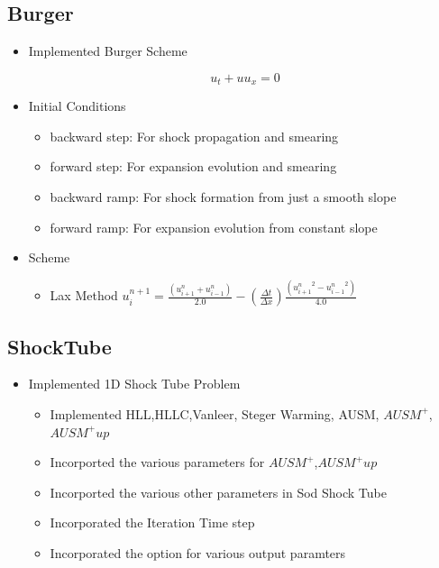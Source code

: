 \documentclass{beamer}
\begin{document}
\subsection{Burger}
\begin{frame}
\begin{itemize}
 \item Implemented Burger Scheme

\begin{equation}
            u_t + u u_x = 0
\end{equation}
\item Initial Conditions
\begin{itemize}	  
\item backward step: For shock propagation and smearing
\item forward step: For expansion evolution and smearing
\item backward ramp: For shock formation from just a smooth slope
\item forward ramp: For expansion evolution from constant slope
\end{itemize}  
\item Scheme
\begin{itemize}	  
\item Lax Method
$u^{n+1}_i = \frac{(u^n_{i+1}+u^n_{i-1})}{2.0} - (\frac{\Delta t}{ \Delta x})\frac{( {u^n_{i+1}}^2- {u^n_{i-1}}^2) }{4.0} $
	    \end{itemize}
\end{itemize}  
\end{frame}
\subsection{ShockTube}
\begin{frame}
\begin{itemize}
 \item Implemented 1D Shock Tube Problem
\begin{itemize}	  
\item Implemented HLL,HLLC,Vanleer, Steger Warming, AUSM, $AUSM^+$,$AUSM^+up$
\item Incorported the various parameters for  $AUSM^+$,$AUSM^+up$
\item Incorported the various other parameters in Sod Shock Tube
\item Incorporated the Iteration Time step
\item Incorporated the option for various output paramters
\end{itemize}  
\end{itemize}  
\end{frame}
\end{document}
